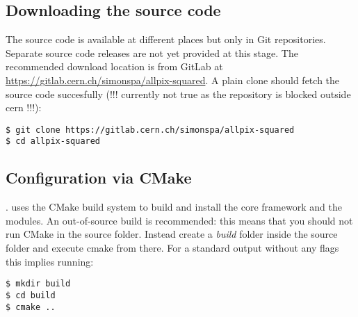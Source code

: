 \subsection{Downloading the source code}
The source code is available at different places but only in Git repositories. Separate source code releases are not yet provided at this stage. The recommended download location is from GitLab at \url{https://gitlab.cern.ch/simonspa/allpix-squared}. A plain clone should fetch the source code succesfully (!!! currently not true as the repository is blocked outside cern !!!):

\begin{verbatim}
$ git clone https://gitlab.cern.ch/simonspa/allpix-squared
$ cd allpix-squared
\end{verbatim}

\subsection{Configuration via CMake}
\label{sec:cmake_config}.
\apsq uses the CMake build system to build and install the core framework and the modules. An out-of-source build is recommended: this means that you should not run CMake in the source folder. Instead create a \textit{build} folder inside the source folder and execute cmake from there. For a standard output without any flags this implies running:

\begin{verbatim}
$ mkdir build
$ cd build
$ cmake ..
\end{verbatim}


